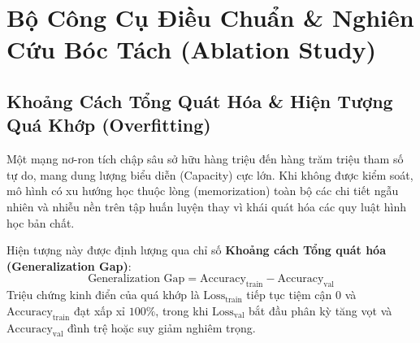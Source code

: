 \documentclass[12pt,a4paper]{report}
\begin{document}
\section{Bộ Công Cụ Điều Chuẩn \& Nghiên Cứu Bóc Tách (Ablation Study)}

\subsection{Khoảng Cách Tổng Quát Hóa \& Hiện Tượng Quá Khớp (Overfitting)}
Một mạng nơ-ron tích chập sâu sở hữu hàng triệu đến hàng trăm triệu tham số tự do, mang dung lượng biểu diễn (Capacity) cực lớn. Khi không được kiểm soát, mô hình có xu hướng học thuộc lòng (memorization) toàn bộ các chi tiết ngẫu nhiên và nhiễu nền trên tập huấn luyện thay vì khái quát hóa các quy luật hình học bản chất. 

Hiện tượng này được định lượng qua chỉ số \textbf{Khoảng cách Tổng quát hóa (Generalization Gap)}:
\begin{equation}
    \text{Generalization Gap} = \text{Accuracy}_{\text{train}} - \text{Accuracy}_{\text{val}}
\end{equation}
Triệu chứng kinh điển của quá khớp là $\text{Loss}_{\text{train}}$ tiếp tục tiệm cận 0 và $\text{Accuracy}_{\text{train}}$ đạt xấp xỉ $100\%$, trong khi $\text{Loss}_{\text{val}}$ bắt đầu phân kỳ tăng vọt và $\text{Accuracy}_{\text{val}}$ đình trệ hoặc suy giảm nghiêm trọng.
\end{document}

